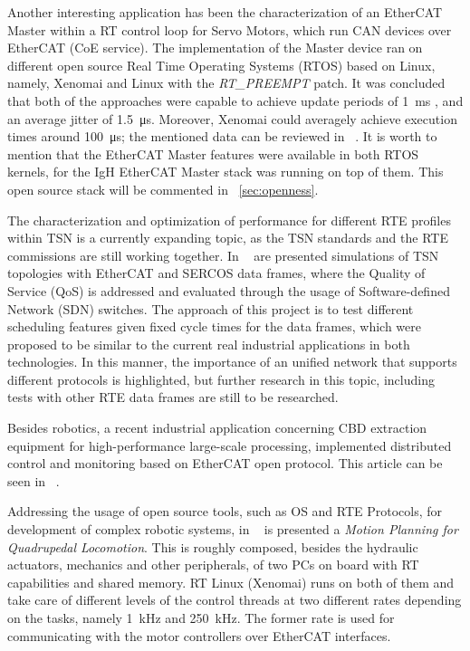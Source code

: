 Another interesting application has been the characterization of an EtherCAT Master within a RT control 
loop for Servo Motors, which run CAN devices over EtherCAT (CoE service). The implementation of the Master 
device ran on different open source Real Time Operating Systems (RTOS) based on Linux, 
namely, Xenomai and Linux with the \emph{RT\_PREEMPT} patch. It was concluded that both of the approaches 
were capable to achieve update periods of \SI{1}{\milli\second} 
, and an average jitter of \SI{1.5}{\micro\second}. Moreover, Xenomai could averagely achieve execution times around \SI{100}{\micro\second}; 
the mentioned data can be reviewed in ~\cite{ecat_xenomai}.%
It is worth to mention that the EtherCAT Master features were available in both RTOS kernels, 
for the IgH EtherCAT Master stack was running on top of them. This open source stack will be commented in ~\ref{sec:openness}.

The characterization and optimization of performance for different RTE profiles within TSN is a currently expanding topic, 
as the TSN standards and the RTE commissions are still working together. In ~\cite{tsn_and_sdn} %
are presented simulations of TSN topologies with EtherCAT and SERCOS data frames, where the Quality of Service (QoS) 
is addressed and evaluated through the usage of Software-defined Network (SDN) switches. 
The approach of this project is to test different scheduling features given fixed cycle times for the data frames, 
which were proposed to be similar to the current real industrial applications
in both technologies. In this manner, the importance of an unified network that supports different protocols is highlighted, 
but further research in this topic, including tests with other RTE data frames are still to be researched.

Besides robotics, a recent industrial application concerning CBD extraction equipment for high-performance large-scale processing,
implemented distributed control and monitoring based on EtherCAT open protocol. This article can be seen in ~\cite{ecat_industrial}.

Addressing the usage of open source tools, such as OS and RTE Protocols, for development of complex robotic systems, in ~\cite{ecat_motionplanning} %
is presented a \emph{Motion Planning for Quadrupedal Locomotion}. This is roughly composed, besides the hydraulic actuators, mechanics and other peripherals, of two PCs on board with RT capabilities and shared memory. 
RT Linux (Xenomai) runs on both of them and take care of different levels of the control threads at two different rates depending on the tasks, 
namely \SI{1}{\kilo\hertz} and \SI{250}{\kilo\hertz}. The former rate is used
for communicating with the motor controllers over EtherCAT interfaces.

